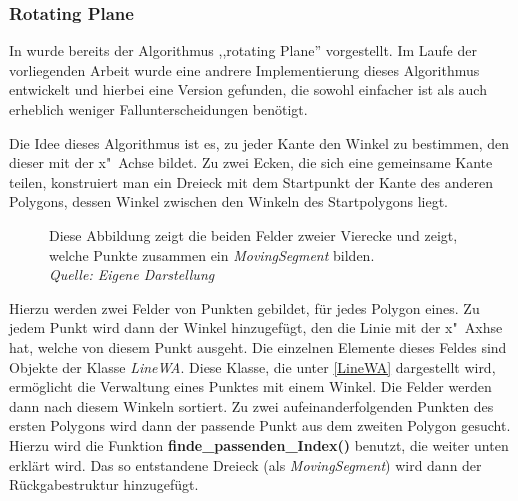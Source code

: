 \clearpage
\subsubsection{Rotating Plane} \label{rotPane}
In \cite{TG} wurde bereits der Algorithmus ,,rotating Plane'' vorgestellt. Im Laufe der vorliegenden Arbeit wurde eine andrere Implementierung dieses Algorithmus entwickelt und hierbei eine Version gefunden, die sowohl einfacher ist als auch erheblich weniger Fallunterscheidungen benötigt.

Die Idee dieses Algorithmus ist es, zu jeder Kante den Winkel zu bestimmen, den dieser mit der x"~Achse bildet. Zu zwei Ecken, die sich eine gemeinsame Kante teilen, konstruiert man ein Dreieck mit dem Startpunkt der Kante des anderen Polygons, dessen Winkel zwischen den Winkeln des Startpolygons liegt.

\begin{figure}
\centering
{}
	\caption[Tabellendarstellung des rotating Plane]{Diese Abbildung zeigt die beiden Felder zweier Vierecke und zeigt, welche Punkte zusammen ein \textit{MovingSegment} bilden.\\\textit{Quelle: Eigene Darstellung}}
	\label{fig:RotatinPane}
\end{figure}


Hierzu werden zwei Felder von Punkten gebildet, für jedes Polygon eines. Zu jedem Punkt wird dann der Winkel hinzugefügt, den die Linie mit der x"~Axhse hat, welche von diesem Punkt ausgeht. Die einzelnen Elemente dieses Feldes sind Objekte der Klasse \textit{LineWA}. Diese Klasse, die unter \vref{LineWA} dargestellt wird, ermöglicht die Verwaltung eines Punktes mit einem Winkel.  Die Felder werden dann nach diesem Winkeln sortiert. Zu zwei aufeinanderfolgenden Punkten des ersten Polygons wird dann der passende Punkt aus dem zweiten Polygon gesucht. Hierzu wird die Funktion \textbf{finde\_passenden\_Index()} benutzt, die weiter unten erklärt wird. Das so entstandene Dreieck (als \textit{MovingSegment}) wird dann der Rückgabestruktur hinzugefügt.

